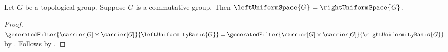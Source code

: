 \begin{corollary}\label{commutative_group_uniform_spaces_equal}
    Let $G$ be a topological group.
    Suppose $G$ is a commutative group.
    Then $\leftUniformSpace{G}=\rightUniformSpace{G}$.
\end{corollary}
\begin{proof}
    $\generatedFilter
        {\carrier[G]\times\carrier[G]}{\leftUniformityBasis{G}}
        =\generatedFilter
        {\carrier[G]\times\carrier[G]}{\rightUniformityBasis{G}}$
        by .
    Follows by .
\end{proof}
